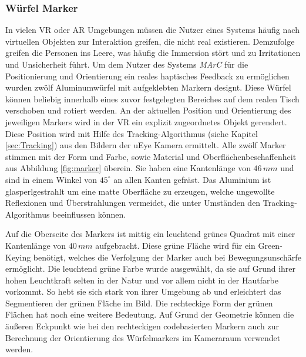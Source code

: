 \subsubsection{Würfel Marker}\label{sec:WürfelMarker} 

In vielen VR oder AR Umgebungen müssen die Nutzer eines Systems häufig nach virtuellen Objekten zur Interaktion greifen, die nicht real existieren. Demzufolge greifen die Personen ins Leere, was häufig die Immersion stört und zu Irritationen und Unsicherheit führt.
Um dem Nutzer des Systems \textit{MArC} für die Positionierung und Orientierung ein reales haptisches Feedback zu ermöglichen wurden zwölf Aluminumwürfel mit aufgeklebten Markern designt. Diese Würfel können beliebig innerhalb eines zuvor festgelegten Bereiches auf dem realen Tisch verschoben und rotiert werden. An der aktuellen Position und Orientierung des jeweiligen Markers wird in der VR ein explizit zugeordnetes Objekt gerendert. Diese Position wird mit Hilfe des Tracking-Algorithmus (siehe Kapitel \ref{sec:Tracking}) aus den Bildern der uEye Kamera ermittelt.
Alle zwölf Marker stimmen mit der Form und Farbe, sowie Material und Oberflächenbeschaffenheit aus Abbildung \ref{fig:marker} überein. Sie haben eine Kantenlänge von $46\,mm$ und sind in einem Winkel von $45^\circ$ an allen Kanten gefräst. Das Aluminium ist glasperlgestrahlt um eine matte Oberfläche zu erzeugen, welche ungewollte Reflexionen und Überstrahlungen vermeidet, die unter Umständen den Tracking-Algorithmus beeinflussen können. 

Auf die Oberseite des Markers ist mittig ein leuchtend grünes Quadrat mit einer Kantenlänge von $40\,mm$ aufgebracht. Diese grüne Fläche wird für ein Green-Keying benötigt, welches die Verfolgung der Marker auch bei Bewegungsunschärfe ermöglicht. Die leuchtend grüne Farbe wurde ausgewählt, da sie auf Grund ihrer hohen Leuchtkraft selten in der Natur und vor allem nicht in der Hautfarbe vorkommt. So hebt sie sich stark von ihrer Umgebung ab und erleichtert das Segmentieren der grünen Fläche im Bild. Die rechteckige Form der grünen Flächen hat noch eine weitere Bedeutung. Auf Grund der Geometrie können die äußeren Eckpunkt wie bei den rechteckigen codebasierten Markern auch zur Berechnung der Orientierung des Würfelmarkers im Kameraraum verwendet werden.

